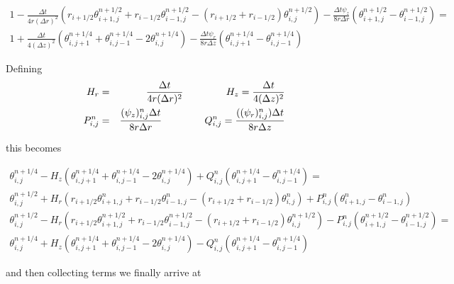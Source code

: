 \documentclass{article}
\begin{document}
\begin{multline}
 1 - \frac{\Delta t}{4 r (\Delta r)^2} \left(r_{i+1/2} \theta^{n+1/2}_{i+1, j} +  r_{i-1/2} \theta^{n+1/2}_{i-1,j} - (r_{i+1/2} + r_{i-1/2}) \theta^{n+1/2}_{i,j} \right) - \frac{\Delta t \psi_z}{8 r \Delta r} \left( \theta^{n+1/2}_{i+1,j} - \theta^{n+1/2}_{i-1,j} \right)= \\ 1 + \frac{\Delta t}{4 (\Delta z)^2} \left(\theta^{n+1/4}_{i, j+1} + \theta^{n+1/4}_{i, j-1} - 2 \theta^{n+1/4}_{i,j}\right) - \frac{\Delta t \psi_r}{8 r \Delta z} \left(\theta^{n+1/4}_{i,j+1} - \theta^{n+1/4}_{i, j-1} \right)
\end{multline}

Defining
\begin{eqnarray}
H_r &=& \frac{\Delta t}{4 r (\Delta r)^2} \hspace{10ex} H_z = \frac{\Delta t}{4 (\Delta z)^2} \\
P_{i,j}^n &=& \frac{(\psi_z)_{i,j}^n  \Delta t }{8 r \Delta r} \hspace{10ex} Q_{i,j}^n = \frac{ (  (\psi_r)_{i,j}^n) \Delta t}{8 r \Delta z}
\end{eqnarray}

this becomes

\begin{multline}
 \theta^{n+1/4}_{i,j} - H_z \left(\theta^{n+1/4}_{i, j+1} + \theta^{n+1/4}_{i, j-1} - 2 \theta^{n+1/4}_{i,j}\right) + Q_{i,j}^n \left(\theta^{n+1/4}_{i,j+1} - \theta^{n+1/4}_{i, j-1} \right) = \\ \theta^{n+1/2}_{i,j} + H_r\left(r_{i+1/2} \theta^n_{i+1, j} + r_{i-1/2} \theta^n_{i-1,j} - (r_{i+1/2} + r_{i-1/2}) \theta^n_{i,j} \right) + P_{i,j}^n \left( \theta^n_{i+1,j} - \theta^n_{i-1,j} \right)
\end{multline}
\begin{multline}
 \theta^{n+1/2}_{i,j} - H_r \left(r_{i+1/2} \theta^{n+1/2}_{i+1, j} +  r_{i-1/2} \theta^{n+1/2}_{i-1,j} - (r_{i+1/2} + r_{i-1/2}) \theta^{n+1/2}_{i,j} \right) - P_{i,j}^n \left( \theta^{n+1/2}_{i+1,j} - \theta^{n+1/2}_{i-1,j} \right)= \\ \theta^{n+1/4}_{i,j} + H_z \left(\theta^{n+1/4}_{i, j+1} + \theta^{n+1/4}_{i, j-1} - 2 \theta^{n+1/4}_{i,j}\right) - Q_{i,j}^n \left(\theta^{n+1/4}_{i,j+1} - \theta^{n+1/4}_{i, j-1} \right)
\end{multline}

and then collecting terms we finally arrive at 
\end{document}
